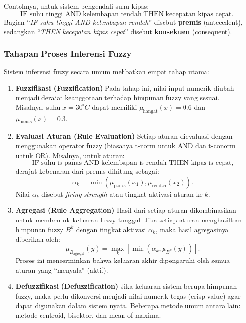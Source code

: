 \documentclass[12pt,a4paper]{article}
\theoremstyle{remark}
\begin{document}
Contohnya, untuk sistem pengendali suhu kipas:
\[
    \text{IF suhu tinggi AND kelembapan rendah THEN kecepatan kipas cepat.}
\]
Bagian “\textit{IF suhu tinggi AND kelembapan rendah}” disebut \textbf{premis} (antecedent), sedangkan “\textit{THEN kecepatan kipas cepat}” disebut \textbf{konsekuen} (consequent).

\subsubsection{Tahapan Proses Inferensi Fuzzy}

Sistem inferensi fuzzy secara umum melibatkan empat tahap utama:

\begin{enumerate}
    \item \textbf{Fuzzifikasi (Fuzzification)}
          Pada tahap ini, nilai input numerik diubah menjadi derajat keanggotaan terhadap himpunan fuzzy yang sesuai.
          Misalnya, suhu \(x = 30^\circ C\) dapat memiliki \(\mu_{\text{hangat}}(x) = 0.6\) dan \(\mu_{\text{panas}}(x) = 0.3\).

    \item \textbf{Evaluasi Aturan (Rule Evaluation)}
          Setiap aturan dievaluasi dengan menggunakan operator fuzzy (biasanya t-norm untuk AND dan t-conorm untuk OR).
          Misalnya, untuk aturan:
          \[
              \text{IF suhu is panas AND kelembapan is rendah THEN kipas is cepat,}
          \]
          derajat kebenaran dari premis dihitung sebagai:
          \[
              \alpha_k = \min(\mu_{\text{panas}}(x_1), \mu_{\text{rendah}}(x_2)).
          \]
          Nilai \(\alpha_k\) disebut \textit{firing strength} atau tingkat aktivasi aturan ke-\(k\).

    \item \textbf{Agregasi (Rule Aggregation)}
          Hasil dari setiap aturan dikombinasikan untuk membentuk keluaran fuzzy tunggal. Jika setiap aturan menghasilkan himpunan fuzzy \(B^k\) dengan tingkat aktivasi \(\alpha_k\), maka hasil agregasinya diberikan oleh:
          \[
              \mu_{B_{\text{agregat}}}(y) = \max_k [ \min(\alpha_k, \mu_{B^k}(y)) ].
          \]
          Proses ini mencerminkan bahwa keluaran akhir dipengaruhi oleh semua aturan yang “menyala” (aktif).

    \item \textbf{Defuzzifikasi (Defuzzification)}
          Jika keluaran sistem berupa himpunan fuzzy, maka perlu dikonversi menjadi nilai numerik tegas (crisp value) agar dapat digunakan dalam sistem nyata.
          Beberapa metode umum antara lain: metode centroid, bisektor, dan mean of maxima.
\end{enumerate}
\end{document}
